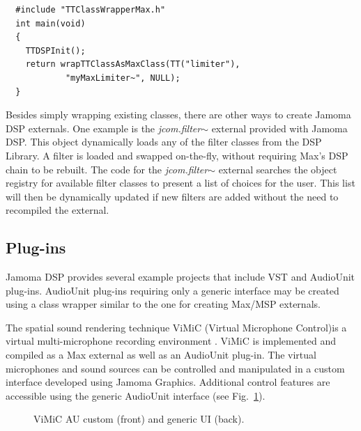 \documentclass[twoside,10pt]{article}
\begin{document}
\begin{lstlisting}
  #include "TTClassWrapperMax.h"
  int main(void)
  {
    TTDSPInit();
    return wrapTTClassAsMaxClass(TT("limiter"), 
            "myMaxLimiter~", NULL);
  }
\end{lstlisting}

\noindent Besides simply wrapping existing classes, there are other ways to create Jamoma DSP externals. One example is the \emph{\small{jcom.filter$\sim$}} external provided with Jamoma DSP.  
This object dynamically loads any of the filter classes from the DSP Library. A filter is loaded and swapped on-the-fly, without requiring Max's DSP chain to be rebuilt.  The code for the \emph{\small{jcom.filter$\sim$}} external searches the object registry for available filter classes to present a list of choices for the user. This list will then be dynamically updated if new filters are added without the need to recompiled the external.   



\subsection{Plug-ins}

Jamoma DSP provides several example projects that include VST and AudioUnit plug-ins.  AudioUnit plug-ins requiring only a generic interface may be created using a class wrapper similar to the one for creating Max/MSP externals.  

The spatial sound rendering technique ViMiC (Virtual Microphone Control)is a virtual multi-microphone recording environment \cite{CMJ08-VIMIC}.  ViMiC is implemented and compiled as a Max external as well as an AudioUnit plug-in. The virtual microphones and sound sources can be controlled and manipulated in a custom interface developed using Jamoma Graphics.  Additional control features are accessible using the generic AudioUnit interface (see Fig.~\ref{fig:vimic}).


\begin{figure}[hb]
\centerline{}
\caption{ViMiC AU custom (front) and generic UI (back).}
\label{fig:vimic}
\end{figure}
\end{document}
